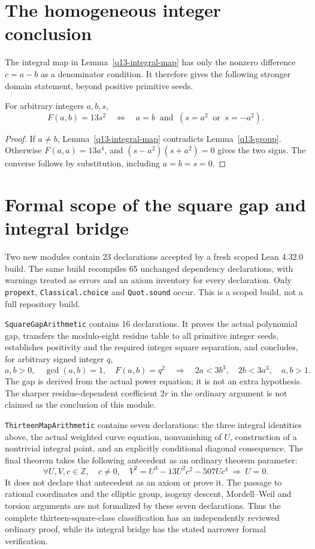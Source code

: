 \section{The homogeneous integer conclusion}
\label{im-section}

The integral map in Lemma~\ref{q13-integral-map} has only the
nonzero difference $c=a-b$ as a denominator condition. It therefore
gives the following stronger domain statement, beyond positive primitive
seeds.

\begin{corollary}
\label{im-all-integers}
For arbitrary integers $a,b,s$,
\[
 F(a,b)=13s^2\quad\Longleftrightarrow\quad
 a=b\ \text{ and }\ (s=a^2\ \text{ or }\ s=-a^2).
\]
\end{corollary}
\begin{proof}
If $a\ne b$, Lemma~\ref{q13-integral-map} contradicts
Lemma~\ref{q13-group}. Otherwise $F(a,a)=13a^4$, and
$(s-a^2)(s+a^2)=0$ gives the two signs. The converse follows by
substitution, including $a=b=s=0$.
\end{proof}

\section{Formal scope of the square gap and integral bridge}
\label{seventh-formal-scope}

Two new modules contain 23 declarations accepted by a fresh scoped Lean
4.32.0 build. The same build recompiles 65 unchanged dependency
declarations, with warnings treated as errors and an axiom inventory for
every declaration. Only \texttt{propext}, \texttt{Classical.choice} and
\texttt{Quot.sound} occur. This is a scoped build, not a full repository
build.

\texttt{SquareGapArithmetic} contains 16 declarations. It proves the
actual polynomial gap, transfers the modulo-eight residue table to all
primitive integer seeds, establishes positivity and the required integer
square separation, and concludes, for arbitrary signed integer $q$,
\[
 a,b>0,\quad \gcd(a,b)=1,\quad F(a,b)=q^2
 \quad\Longrightarrow\quad
 2a<3b^3,\quad 2b<3a^3,\quad a,b>1.
\]
The gap is derived from the actual power equation; it is not an extra
hypothesis. The sharper residue-dependent coefficient $2r$ in the
ordinary argument is not claimed as the conclusion of this module.

\texttt{ThirteenMapArithmetic} contains seven declarations: the three
integral identities above, the actual weighted curve equation,
nonvanishing of $U$, construction of a nontrivial integral point, and
an explicitly conditional diagonal consequence. The final theorem takes
the following antecedent as an ordinary theorem parameter:
\[
 \forall U,V,c\in\mathbb Z,\quad c\ne0,\quad
 V^2=U^3-13U^2c^2-507Uc^4\ \Longrightarrow\ U=0.
\]
It does not declare that antecedent as an axiom or prove it. The passage
to rational coordinates and the elliptic group, isogeny descent,
Mordell--Weil and torsion arguments are not formalized by these seven
declarations. Thus the complete thirteen-square-class classification
has an independently reviewed ordinary proof, while its integral bridge
has the stated narrower formal verification.

